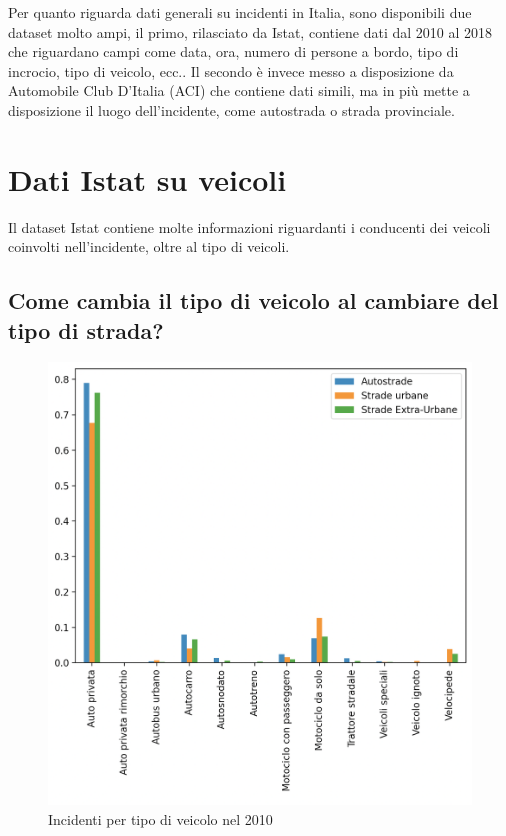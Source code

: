 \documentclass[a4paper]{report}
\begin{document}
Per quanto riguarda dati generali su incidenti in Italia, sono disponibili due dataset molto ampi, 
il primo, rilasciato da Istat, contiene dati dal 2010 al 2018 che riguardano campi come data, ora, 
numero di persone a bordo, tipo di incrocio, tipo di veicolo, ecc..
Il secondo è invece messo a disposizione da Automobile Club D'Italia (ACI) che contiene dati simili, 
ma in più mette a disposizione il luogo dell'incidente, come autostrada o strada provinciale.

\section{Dati Istat su veicoli}

Il dataset Istat contiene molte informazioni riguardanti i conducenti dei veicoli coinvolti 
nell'incidente, oltre al tipo di veicoli.

\subsection{Come cambia il tipo di veicolo al cambiare del tipo di strada?}

\begin{figure}
    \includegraphics[width=\linewidth]{../src/incidenti/incidenti_senza_coords/tipo_veicoli/differenza_strade.png}
    \caption{Incidenti per tipo di veicolo nel 2010}
    \label{fig:differenza_strade}
\end{figure}
\end{document}
